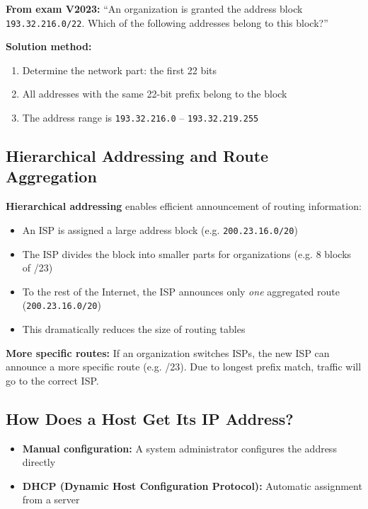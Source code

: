 \begin{exambox}
\textbf{From exam V2023:} ``An organization is granted the address block \texttt{193.32.216.0/22}. Which of the following addresses belong to this block?''

\textbf{Solution method:}
\begin{enumerate}[noitemsep]
    \item Determine the network part: the first 22 bits
    \item All addresses with the same 22-bit prefix belong to the block
    \item The address range is \texttt{193.32.216.0} -- \texttt{193.32.219.255}
\end{enumerate}
\end{exambox}

\subsection{Hierarchical Addressing and Route Aggregation}

\begin{keybox}
\textbf{Hierarchical addressing} enables efficient announcement of routing information:
\begin{itemize}[noitemsep]
    \item An ISP is assigned a large address block (e.g. \texttt{200.23.16.0/20})
    \item The ISP divides the block into smaller parts for organizations (e.g. 8 blocks of /23)
    \item To the rest of the Internet, the ISP announces only \emph{one} aggregated route (\texttt{200.23.16.0/20})
    \item This dramatically reduces the size of routing tables
\end{itemize}

\textbf{More specific routes:} If an organization switches ISPs, the new ISP can announce a more specific route (e.g. /23). Due to longest prefix match, traffic will go to the correct ISP.
\end{keybox}

\subsection{How Does a Host Get Its IP Address?}

\begin{keybox}
\begin{itemize}[noitemsep]
    \item \textbf{Manual configuration:} A system administrator configures the address directly
    \item \textbf{DHCP (Dynamic Host Configuration Protocol):} Automatic assignment from a server
\end{itemize}
\end{keybox}

